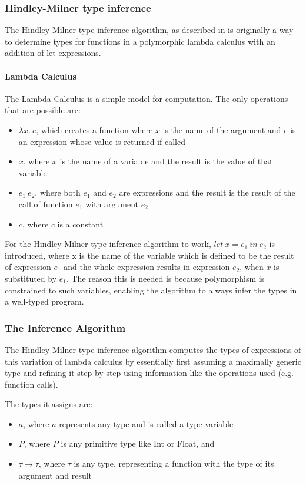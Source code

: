 \documentclass[12pt]{article}
\begin{document}
\subsubsection{Hindley-Milner type inference}
The Hindley-Milner type inference algorithm, as described in
\autocite{damasPrincipalTypeschemesFunctional1982}
is originally a way to determine types for functions in a
polymorphic lambda calculus with an addition of let expressions.

\paragraph{Lambda Calculus}
The Lambda Calculus is a simple model for computation.
The only operations that are possible are:
\begin{itemize}
	\item $\lambda x.\:e$,
	      which creates a function where $x$ is the name of the argument
	      and $e$ is an expression whose value is returned if called
	\item $x$, where $x$ is the name of a variable
	      and the result is the value of that variable
	\item $e_1\:e_2$, where both $e_1$ and $e_2$ are expressions and the result
	      is the result of the call of function $e_1$ with argument $e_2$\item $c$, where $c$ is a constant
\end{itemize}

For the Hindley-Milner type inference algorithm to work,
$let\:x = e_1\:in\:e_2$ is introduced, where x is the name of the variable
which is defined to be the result of expression $e_1$
and the whole expression results in expression $e_2$,
when $x$ is substituted by $e_1$.
The reason this is needed is because polymorphism is constrained
to such variables, enabling the algorithm to always infer the types
in a well-typed program.

\subsubsection{The Inference Algorithm}
The Hindley-Milner type inference algorithm computes the types of expressions
of this variation of lambda calculus
by essentially first assuming a maximally generic type and refining it step by step
using information like the operations used (e.g. function calls).

The types it assigns are:
\begin{itemize}
	\item $a$, where $a$ represents any type and is called a type variable
	\item $P$, where $P$ is any primitive type like Int or Float, and
	\item $\tau \rightarrow \tau$, where $\tau$ is any type, representing
	      a function with the type of its argument and result
\end{itemize}
\end{document}

